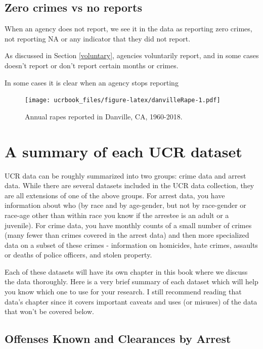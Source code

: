 \documentclass[
  12pt,
  openany]{book}
\begin{document}
\hypertarget{zero-crimes-vs-no-reports}{%
\subsection{Zero crimes vs no reports}\label{zero-crimes-vs-no-reports}}

When an agency does not report, we see it in the data as reporting zero crimes, not reporting NA or any indicator that they did not report.

As discussed in Section \ref{voluntary}, agencies voluntarily report, and in some cases doesn't report or don't report certain months or crimes.

In some cases it is clear when an agency stops reporting

\begin{figure}
\centering
\texttt{[image: ucrbook\_files/figure-latex/danvilleRape-1.pdf]}
\caption{\label{fig:danvilleRape}Annual rapes reported in Danville, CA, 1960-2018.}
\end{figure}

\hypertarget{a-summary-of-each-ucr-dataset}{%
\section{A summary of each UCR dataset}\label{a-summary-of-each-ucr-dataset}}

UCR data can be roughly summarized into two groups: crime data and arrest data. While there are several datasets included in the UCR data collection, they are all extensions of one of the above groups. For arrest data, you have information about who (by race and by age-gender, but not by race-gender or race-age other than within race you know if the arrestee is an adult or a juvenile). For crime data, you have monthly counts of a small number of crimes (many fewer than crimes covered in the arrest data) and then more specialized data on a subset of these crimes - information on homicides, hate crimes, assaults or deaths of police officers, and stolen property.

Each of these datasets will have its own chapter in this book where we discuss the data thoroughly. Here is a very brief summary of each dataset which will help you know which one to use for your research. I still recommend reading that data's chapter since it covers important caveats and uses (or misuses) of the data that won't be covered below.

\hypertarget{offenses-known-and-clearances-by-arrest}{%
\subsection{Offenses Known and Clearances by Arrest}\label{offenses-known-and-clearances-by-arrest}}
\end{document}
